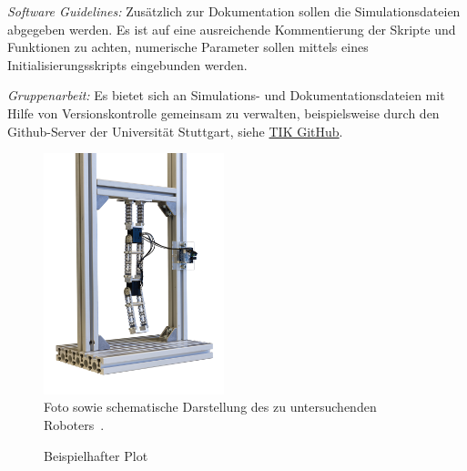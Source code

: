 \documentclass{MSM_latex}
\begin{document}
\textit{Software Guidelines:}
Zusätzlich zur Dokumentation sollen die Simulationsdateien abgegeben werden.
Es ist auf eine ausreichende Kommentierung der Skripte und Funktionen zu achten, numerische Parameter sollen mittels eines Initialisierungsskripts eingebunden werden.

\textit{Gruppenarbeit:}
Es bietet sich an Simulations- und Dokumentationsdateien mit Hilfe von Versionskontrolle gemeinsam zu verwalten, beispielsweise durch den Github-Server der Universität Stuttgart, siehe \href{https://www.tik.uni-stuttgart.de/dienste-a-z/Git-Hosting/}{TIK GitHub}.




\clearpage


\begin{figure}[t]
	\centering
	\includegraphics[height=7cm]{img/Versuchsaufbau.png}
	\hspace{1cm}
	\def\svgwidth{5.5cm}
	
	\caption{Foto sowie schematische Darstellung des zu untersuchenden Roboters~\cite{Fuchs23}.}
	\label{fig:Roboter}
\end{figure}

\def\myLineWidth{1.5pt}

%
% 
\begin{figure}[t]
	\centering
	
	\caption{Beispielhafter Plot}
	\label{fig:plot_example}
\end{figure}



\end{document}
